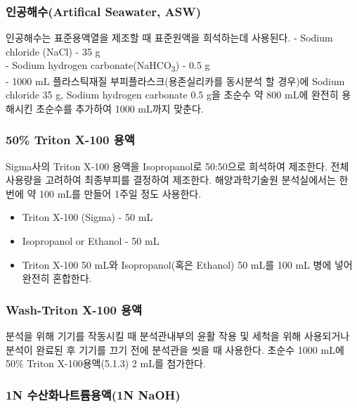 \documentclass[
]{book}
\providecommand{\tightlist}{%
  \setlength{\itemsep}{0pt}\setlength{\parskip}{0pt}}
\begin{document}
\hypertarget{uxc778uxacf5uxd574uxc218artifical-seawater-asw}{%
\subsubsection{인공해수(Artifical Seawater, ASW)}\label{uxc778uxacf5uxd574uxc218artifical-seawater-asw}}

인공해수는 표준용액열을 제조할 때 표준원액을 희석하는데 사용된다.
- Sodium chloride (NaCl) - 35 g\\
- Sodium hydrogen carbonate(NaHCO\textsubscript{3}) - 0.5 g\\
- 1000 mL 플라스틱재질 부피플라스크(용존실리카를 동시분석 할 경우)에 Sodium chloride 35 g, Sodium hydrogen carbonate 0.5 g을 초순수 약 800 mL에 완전히 용해시킨 초순수를 추가하여 1000 mL까지 맞춘다.

\hypertarget{triton-x-100-uxc6a9uxc561}{%
\subsubsection{50\% Triton X-100 용액}\label{triton-x-100-uxc6a9uxc561}}

Sigma사의 Triton X-100 용액을 Isopropanol로 50:50으로 희석하여 제조한다. 전체 사용량을 고려하여 최종부피를 결정하여 제조한다. 해양과학기술원 분석실에서는 한 번에 약 100 mL를 만들어 1주일 정도 사용한다.

\begin{itemize}
\tightlist
\item
  Triton X-100 (Sigma) - 50 mL
\item
  Isopropanol or Ethanol - 50 mL
\item
  Triton X-100 50 mL와 Isopropanol(혹은 Ethanol) 50 mL를 100 mL 병에 넣어 완전히 혼합한다.
\end{itemize}

\hypertarget{wash-triton-x-100-uxc6a9uxc561}{%
\subsubsection{Wash-Triton X-100 용액}\label{wash-triton-x-100-uxc6a9uxc561}}

분석을 위해 기기를 작동시킬 때 분석관내부의 윤활 작용 및 세척을 위해 사용되거나 분석이 완료된 후 기기를 끄기 전에 분석관을 씻을 때 사용한다. 초순수 1000 mL에 50\% Triton X-100용액(5.1.3) 2 mL를 첨가한다.

\hypertarget{n-uxc218uxc0b0uxd654uxb098uxd2b8uxb968uxc6a9uxc5611n-naoh}{%
\subsubsection{1N 수산화나트륨용액(1N NaOH)}\label{n-uxc218uxc0b0uxd654uxb098uxd2b8uxb968uxc6a9uxc5611n-naoh}}
\end{document}
